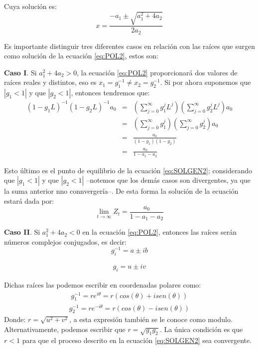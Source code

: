 \documentclass[
]{book}
\begin{document}
Cuya solución es:
\begin{equation}
    x = \frac{- a_1 \pm \sqrt{a^2_1 + 4 a_2}}{2 a_2}
    \label{eq:eqcaracteristica5}
\end{equation}

Es importante distinguir tres diferentes casos en relación con las raíces que surgen como solución de la ecuación \eqref{eq:POL2}, estos son:

\textbf{Caso I}. Si \(a^2_1 + 4 a_2 > 0\), la ecuación \eqref{eq:POL2} proporcionará dos valores de raíces reales y distintos, eso es \(x_1 = g^{-1}_1 \neq x_2 = g^{-1}_2\). Si por ahora suponemos que \(|{g_1} < 1|\) y que \(|{g_2} < 1|\), entonces tendremos que:
\begin{eqnarray}
    (1 - g_1 L)^{-1} (1 - g_2 L)^{-1} a_0 & =&  \left( \sum^{\infty}_{j = 0}{g^j_1 L^j} \right) \left( \sum^{\infty}_{j = 0}{g^j_2 L^j} \right) a_0 \nonumber \\
    & = & \left( \sum^{\infty}_{j = 0}{g^j_1} \right) \left( \sum^{\infty}_{j = 0}{g^j_2} \right) a_0 \nonumber \\
    & = & \frac{a_0}{(1 - g_1)(1 - g_2)} \nonumber \\
    & = & \frac{a_0}{1 - a_1 - a_2}
    \label{eq:eqcaracteristica6}
\end{eqnarray}

Esto último es el punto de equilibrio de la ecuación \eqref{eq:SOLGEN2}; considerando que \(|{g_1} < 1|\) y que \(|{g_2} < 1|\) --notemos que los demás casos son divergentes, ya que la suma anterior nno connvergería--. De esta forma la solución de la ecuación estará dada por:
\begin{equation}
    \lim_{t \to \infty} Z_t = \frac{a_0}{1 - a_1 - a_2}
    \label{eq:Conver}
\end{equation}

\textbf{Caso II}. Si \(a_1^2 + 4a_2 < 0\) en la ecuación \eqref{eq:POL2}, entonces las raíces serán números complejos conjugados, es decir:
\begin{equation}
g_i^{-1}=a \pm ib
\label{eq:Conver1}
\end{equation}

\begin{eqnarray}
    g_i  =  u \pm iv 
    \label{eq:Conver2}
\end{eqnarray}

Dichas raíces las podemos escribir en coordenadas polares como:
\begin{eqnarray}
    g_1^{-1} = r e^{i \theta} = r (cos(\theta) + i sen(\theta))
    \label{eq:Conver3}
\end{eqnarray}
\begin{eqnarray}
    g_2^{-1}  =  r e^{-i \theta} = r (cos(\theta) - i sen(\theta))
    \label{eq:Conver4}
\end{eqnarray}
Donde: \(r = \sqrt{u^2 + v^2}\), a esta expresión también se le conoce como modulo. Alternativamente, podemos escribir que \(r = \sqrt{g_1 g_2}\). La única condición es que \(r < 1\) para que el proceso descrito en la ecuación \eqref{eq:SOLGEN2} sea convergente.
\end{document}
